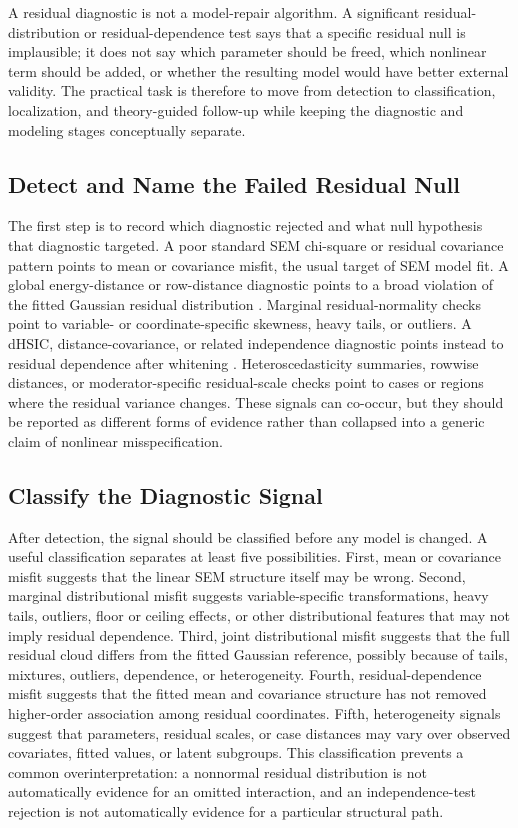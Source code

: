 \documentclass[floatsintext,a4paper]{apa7} %
\begin{document}
	A residual diagnostic is not a model-repair algorithm. A significant residual-distribution or residual-dependence test says that a specific residual null is implausible; it does not say which parameter should be freed, which nonlinear term should be added, or whether the resulting model would have better external validity. The practical task is therefore to move from detection to classification, localization, and theory-guided follow-up while keeping the diagnostic and modeling stages conceptually separate.
	
	\subsection{Detect and Name the Failed Residual Null}
	The first step is to record which diagnostic rejected and what null hypothesis that diagnostic targeted. A poor standard SEM chi-square or residual covariance pattern points to mean or covariance misfit, the usual target of SEM model fit. A global energy-distance or row-distance diagnostic points to a broad violation of the fitted Gaussian residual distribution \citep{rizzo2016energy}. Marginal residual-normality checks point to variable- or coordinate-specific skewness, heavy tails, or outliers. A dHSIC, distance-covariance, or related independence diagnostic points instead to residual dependence after whitening \citep{pfister2018kernelbased,karch2024pearsons}. Heteroscedasticity summaries, rowwise distances, or moderator-specific residual-scale checks point to cases or regions where the residual variance changes. These signals can co-occur, but they should be reported as different forms of evidence rather than collapsed into a generic claim of nonlinear misspecification.
	
	\subsection{Classify the Diagnostic Signal}
	After detection, the signal should be classified before any model is changed. A useful classification separates at least five possibilities. First, mean or covariance misfit suggests that the linear SEM structure itself may be wrong. Second, marginal distributional misfit suggests variable-specific transformations, heavy tails, outliers, floor or ceiling effects, or other distributional features that may not imply residual dependence. Third, joint distributional misfit suggests that the full residual cloud differs from the fitted Gaussian reference, possibly because of tails, mixtures, outliers, dependence, or heterogeneity. Fourth, residual-dependence misfit suggests that the fitted mean and covariance structure has not removed higher-order association among residual coordinates. Fifth, heterogeneity signals suggest that parameters, residual scales, or case distances may vary over observed covariates, fitted values, or latent subgroups. This classification prevents a common overinterpretation: a nonnormal residual distribution is not automatically evidence for an omitted interaction, and an independence-test rejection is not automatically evidence for a particular structural path.
	
\end{document}
